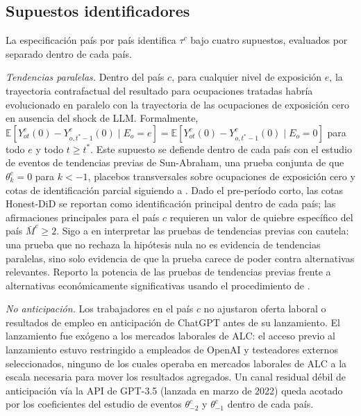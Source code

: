 \subsection{Supuestos identificadores}
\label{subsec:method_assumptions}

La especificación país por país identifica $\tau^c$ bajo cuatro supuestos, evaluados por separado dentro de cada país.

\emph{Tendencias paralelas.} Dentro del país $c$, para cualquier nivel de exposición $e$, la trayectoria contrafactual del resultado para ocupaciones tratadas habría evolucionado en paralelo con la trayectoria de las ocupaciones de exposición cero en ausencia del shock de LLM. Formalmente, $\mathbb{E}[Y_{ot}^c(0) - Y_{o,t^\ast - 1}^c(0) \mid E_{o} = e] = \mathbb{E}[Y_{ot}^c(0) - Y_{o,t^\ast - 1}^c(0) \mid E_{o} = 0]$ para todo $e$ y todo $t \geq t^\ast$. Este supuesto se defiende dentro de cada país con el estudio de eventos de tendencias previas de Sun-Abraham, una prueba conjunta de que $\theta_k^c = 0$ para $k < -1$, placebos transversales sobre ocupaciones de exposición cero y cotas de identificación parcial siguiendo a \citet{RambachanRoth2023_honest}. Dado el pre-período corto, las cotas Honest-DiD se reportan como identificación principal dentro de cada país; las afirmaciones principales para el país $c$ requieren un valor de quiebre específico del país $\bar M^c \geq 2$. Sigo a \citet{Roth2022_pretest_caution} en interpretar las pruebas de tendencias previas con cautela: una prueba que no rechaza la hipótesis nula no es evidencia de tendencias paralelas, sino solo evidencia de que la prueba carece de poder contra alternativas relevantes. Reporto la potencia de las pruebas de tendencias previas frente a alternativas econ\'omicamente significativas usando el procedimiento de \citet{Roth2022_pretest_caution}.

\emph{No anticipación.} Los trabajadores en el país $c$ no ajustaron oferta laboral o resultados de empleo en anticipación de ChatGPT antes de su lanzamiento. El lanzamiento fue exógeno a los mercados laborales de ALC: el acceso previo al lanzamiento estuvo restringido a empleados de OpenAI y testeadores externos seleccionados, ninguno de los cuales operaba en mercados laborales de ALC a la escala necesaria para mover los resultados agregados. Un canal residual débil de anticipación vía la API de GPT-3.5 (lanzada en marzo de 2022) queda acotado por los coeficientes del estudio de eventos $\theta_{-2}^c$ y $\theta_{-1}^c$ dentro de cada país.


